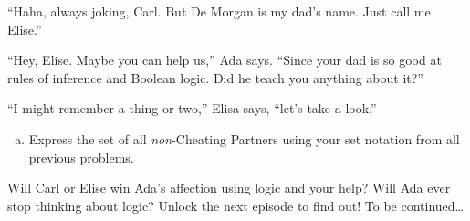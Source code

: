 \documentclass{article}
\begin{document}
``Haha, always joking, Carl. But De Morgan is my dad's name.
Just call me Elise.''

``Hey, Elise. Maybe you can help us,'' Ada says.
``Since your dad is so good at rules of inference and Boolean logic.
Did he teach you anything about it?''

``I might remember a thing or two,'' Elisa says, ``let's take a look.''

\begin{enumerate}[(d)]
\item
Express the set of all \emph{non}-Cheating Partners
using your set notation from all previous problems.
\end{enumerate}

Will Carl or Elise win Ada's affection using logic
and your help?
Will Ada ever stop thinking about logic?
Unlock the next episode to find out!
To be continued\ldots
\end{document}

